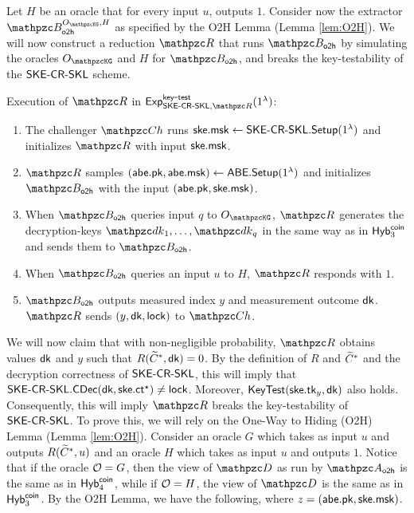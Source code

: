 Let $H$ be an oracle that for every input $u$, outputs $1$.
Consider now the extractor $\qB_\oh^{\Oracle{\qKG}, H}$
as specified by the O2H Lemma (Lemma \ref{lem:O2H}). We will now
construct a reduction $\qR$ that runs $\qB_\oh$ by simulating the oracles
$\Oracle{\qKG}$ and $H$ for $\qB_\oh$, and breaks the
key-testability of the $\mathsf{SKE}\textrm{-}\mathsf{CR}\textrm{-}\mathsf{SKL}$ scheme.

\begin{description}
\item Execution of $\qR$ in
$\expb{\SKECRSKL,\qR}{key}{test}(1^\secp)$:

\begin{enumerate}
\item The challenger $\qCh$ runs $\mathsf{ske}.\mathsf{msk} \leftarrow
\mathsf{SKE}\textrm{-}\mathsf{CR}\textrm{-}\mathsf{SKL}.\mathsf{Setup}(1^\lambda)$ and
initializes $\qR$ with input $\mathsf{ske}.\mathsf{msk}$.
\item $\qR$ samples $(\mathsf{abe}.\mathsf{pk}, \mathsf{abe}.\mathsf{msk}) \leftarrow
\mathsf{ABE}.\mathsf{Setup}(1^\lambda)$ and initializes $\qB_\oh$ with the input
$(\mathsf{abe}.\mathsf{pk}, \mathsf{ske}.\mathsf{msk})$.
\item When $\qB_\oh$ queries input $q$ to $\Oracle{\qKG}$, $\qR$
generates the decryption-keys $\qdk_1, \ldots, \qdk_q$ in the same way
as in $\mathsf{Hyb}_3^{\mathsf{coin}}$ and sends them to $\qB_\oh$.

\item When $\qB_\oh$ queries an input $u$ to $H$, $\qR$ responds with $1$.

\item $\qB_\oh$ outputs measured index $y$ and measurement outcome $\mathsf{dk}$. $\qR$ sends $(y, \mathsf{dk}, \mathsf{lock})$
to $\qCh$.

\end{enumerate}
\end{description}

We will now claim that with non-negligible probability, $\qR$ obtains
values $\mathsf{dk}$ and $y$ such that $R(\widetilde{C}^*, \mathsf{dk}) = 0$. By the definition of
$R$ and $\widetilde{C}^*$ and the decryption correctness of $\mathsf{SKE}\textrm{-}\mathsf{CR}\textrm{-}\mathsf{SKL}$, this
will imply that $\mathsf{SKE}\textrm{-}\mathsf{CR}\textrm{-}\mathsf{SKL}.\mathsf{CDec}(\mathsf{dk}, \allowbreak\mathsf{ske}.\mathsf{ct}^\star) \neq
\mathsf{lock}$. Moreover, $\mathsf{KeyTest}(\mathsf{ske}.\mathsf{tk}_y, \mathsf{dk})$ also holds.
Consequently, this will imply $\qR$ breaks the key-testability of
$\mathsf{SKE}\textrm{-}\mathsf{CR}\textrm{-}\mathsf{SKL}$. To prove this, we will rely on the One-Way to Hiding
(O2H) Lemma (Lemma \ref{lem:O2H}).  Consider an oracle $G$ which takes
as input $u$ and outputs $R(\widetilde{C}^*, u)$ and an oracle $H$ which takes
as input $u$ and outputs $1$. Notice that if the oracle $\mathcal{O} = G$,
then the view of $\qD$ as run by $\qA_\oh$ is the same as in
$\mathsf{Hyb}_4^{\mathsf{coin}}$, while if $\mathcal{O} = H$, the view of $\qD$ is the same as
in $\mathsf{Hyb}_3^{\mathsf{coin}}$. By the O2H Lemma, we have the following, where $z =
(\mathsf{abe}.\mathsf{pk}, \mathsf{ske}.\mathsf{msk})$.

